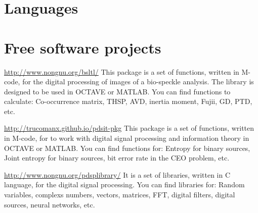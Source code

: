 \documentclass[11pt,a4paper,sans]{moderncv} %
\begin{document}

\section{Languages}


 
\section{Free software projects}

			{\url{http://www.nongnu.org/bsltl/}}
			{}{}
			{This package is a set of functions, written in M-code, 
			for the digital processing of images  of a bio-speckle analysis.
			The library is designed to be used in OCTAVE or MATLAB.
			You can find functions to calculate:
			Co-occurrence matrix, THSP, AVD, inertia moment,
			Fujii, GD, PTD, etc.}

			{\url{http://trucomanx.github.io/pdsit-pkg}}
			{}{}
			{This package is a set of functions, written in M-code, for to work
			with digital signal processing and information theory
			in OCTAVE or MATLAB. You can find functions for:
			Entropy for binary sources, Joint entropy for binary sources,
			bit error rate in the CEO problem, etc. }
			
		

			{\url{http://www.nongnu.org/pdsplibrary/}}
			{}{}
			{It is a set of libraries, written in C language, for 
			the digital signal processing. You can find libraries for:
			Random variables, complexs numbers, vectors, matrices, FFT,
			digital filters, digital sources, neural networks, etc.}

\end{document}
